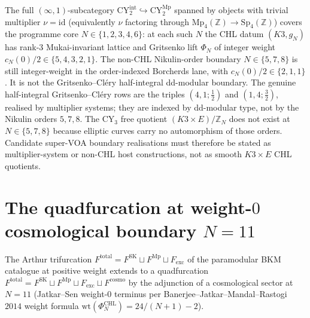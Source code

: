 \begin{remark}
\label{rem:k3e-CYint-CYhalf}
The full $(\infty, 1)$-subcategory
$\mathrm{CY}_2^{\mathrm{int}} \hookrightarrow \mathrm{CY}_2^{\mathrm{Mp}}$
spanned by objects with trivial multiplier $\nu = \mathrm{id}$
(equivalently $\nu$ factoring through
$\mathrm{Mp}_4(\mathbb{Z}) \to \mathrm{Sp}_4(\mathbb{Z})$) covers the
programme core $N \in \{1, 2, 3, 4, 6\}$: at each such $N$ the CHL datum
$(K3, g_N)$ has rank-$3$ Mukai-invariant lattice and Gritsenko lift
$\Phi_N$ of integer weight
$c_N(0)/2 \in \{5, 4, 3, 2, 1\}$. The non-CHL Nikulin-order boundary
$N \in \{5, 7, 8\}$ is still integer-weight in the order-indexed
Borcherds lane, with $c_N(0)/2 \in \{2, 1, 1\}$. It is not the
Gritsenko--Cl\'ery half-integral dd-modular boundary. The genuine
half-integral Gritsenko--Cl\'ery rows are the triples
$(4,1;\tfrac12)$ and $(1,4;\tfrac32)$, realised by multiplier systems;
they are indexed by dd-modular type, not by the Nikulin orders
$5,7,8$. The CY$_3$ free quotient $(K3 \times E)/\mathbb{Z}_N$ does
not exist at $N \in \{5, 7, 8\}$ because elliptic curves carry no
automorphism of those orders. Candidate super-VOA boundary realisations
must therefore be stated as multiplier-system or non-CHL host
constructions, not as smooth $K3 \times E$ CHL quotients.
\end{remark}

\section{The quadfurcation at weight-\texorpdfstring{$0$}{0} cosmological boundary \texorpdfstring{$N = 11$}{N = 11}}
\label{sec:k3e-quadfurcation}

The Arthur trifurcation $F^{\mathrm{total}} = F^{\mathrm{SK}} \sqcup F^{\mathrm{Mp}} \sqcup F_{\mathrm{exc}}$ of the paramodular BKM catalogue at positive weight extends to a quadfurcation $F^{\mathrm{total}} = F^{\mathrm{SK}} \sqcup F^{\mathrm{Mp}} \sqcup F_{\mathrm{exc}} \sqcup F^{\mathrm{cosmo}}$ by the adjunction of a cosmological sector at $N = 11$ (Jatkar--Sen weight-$0$ terminus per Banerjee--Jatkar--Mandal--Rastogi~$2014$ weight formula $\mathrm{wt}(\Phi^{\mathrm{CHL}}_N) = 24/(N + 1) - 2$).

